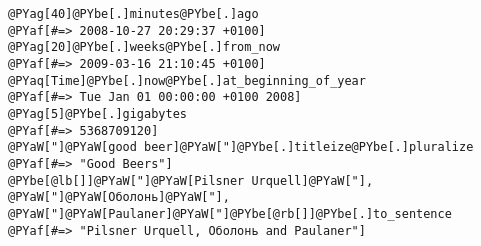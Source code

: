 \begin{Verbatim}[commandchars=@\[\]]
@PYag[40]@PYbe[.]minutes@PYbe[.]ago
@PYaf[#=> 2008-10-27 20:29:37 +0100]
@PYag[20]@PYbe[.]weeks@PYbe[.]from_now
@PYaf[#=> 2009-03-16 21:10:45 +0100]
@PYaq[Time]@PYbe[.]now@PYbe[.]at_beginning_of_year
@PYaf[#=> Tue Jan 01 00:00:00 +0100 2008]
@PYag[5]@PYbe[.]gigabytes
@PYaf[#=> 5368709120]
@PYaW["]@PYaW[good beer]@PYaW["]@PYbe[.]titleize@PYbe[.]pluralize
@PYaf[#=> "Good Beers"]
@PYbe[@lb[]]@PYaW["]@PYaW[Pilsner Urquell]@PYaW["], @PYaW["]@PYaW[Оболонь]@PYaW["], @PYaW["]@PYaW[Paulaner]@PYaW["]@PYbe[@rb[]]@PYbe[.]to_sentence
@PYaf[#=> "Pilsner Urquell, Оболонь and Paulaner"]
\end{Verbatim}
